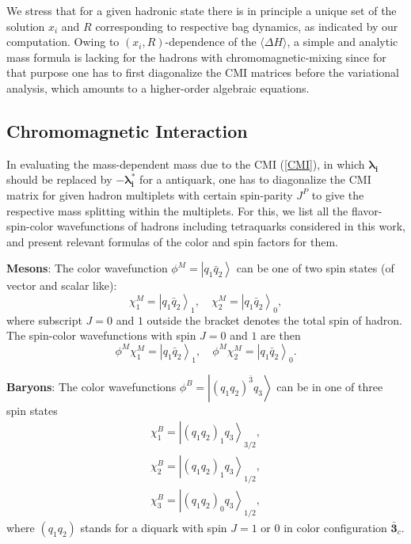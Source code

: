 \documentclass[prd,twocolumn,floatfix,nofootinbib]{revtex4}
\begin{document}
We stress that for a given hadronic state there is in principle a unique set
of the solution $x_{i}$ and $R$ corresponding to respective bag dynamics, as
indicated by our computation. Owing to $(x_{i},R)$-dependence of the $%
\langle \Delta H \rangle$, a simple and analytic mass formula is lacking for
the hadrons with chromomagnetic-mixing since for that purpose one has to
first diagonalize the CMI matrices before the variational analysis, which
amounts to a higher-order algebraic equations.

\subsection{Chromomagnetic Interaction}

In evaluating the mass-dependent mass due to the CMI (\ref{CMI}), in which $%
\boldsymbol{\lambda _{i}}$ should be replaced by $-\boldsymbol{\lambda
_{i}^{\ast }}$ for a antiquark, one has to diagonalize the CMI matrix for
given hadron multiplets with certain spin-parity $J^{P}$ to give the
respective mass splitting \cite{Luo:2017eub} within the multiplets. For
this, we list all the flavor-spin-color wavefunctions of hadrons including
tetraquarks considered in this work, and present relevant formulas of the
color and spin factors for them.

\textbf{Mesons}: The color wavefunction $\phi ^{M}=\left\vert q_{1}\bar{q}%
_{2}\right\rangle $ can be one of two spin states (of vector and scalar
like):
\begin{equation}
\chi _{1}^{M}={\left\vert q_{1}\bar{q}_{2}\right\rangle }_{1},\quad \chi
_{2}^{M}={\left\vert q_{1}\bar{q}_{2}\right\rangle }_{0},  \label{spinM}
\end{equation}%
where subscript $J=0$ and $1$ outside the bracket denotes the total spin of
hadron. The spin-color wavefunctions with spin $J=0$ and $1$ are then
\begin{equation}
\phi ^{M}\chi _{1}^{M}={\left\vert q_{1}\bar{q}_{2}\right\rangle }_{1},\quad
\phi ^{M}\chi _{2}^{M}={\left\vert q_{1}\bar{q}_{2}\right\rangle }_{0}.
\label{colorspinM}
\end{equation}

\textbf{Baryons}: The color wavefunctions $\phi ^{B}=\left\vert {\left(
q_{1}q_{2}\right) }^{\bar{3}}q_{3}\right\rangle $ can be in one of three
spin states
\begin{equation}
\begin{aligned} \chi_{1}^{B}={\left| {\left(q_{1}q_{2}\right)}_{1} q_{3}
\right\rangle}_{3/2}, \\ \chi_{2}^{B}={\left| {\left(q_{1}q_{2}\right)}_{1}
q_{3} \right\rangle}_{1/2}, \\ \chi_{3}^{B}={\left|
{\left(q_{1}q_{2}\right)}_{0} q_{3} \right\rangle}_{1/2}, \end{aligned}
\label{spinB}
\end{equation}%
where $\left( q_{1}q_{2}\right) $ stands for a diquark with spin $J=1$ or $0$
in color configuration $\boldsymbol{\bar{3}}_{c}$.
\end{document}
